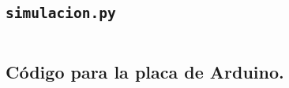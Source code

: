 











\subsection{ \texttt{simulacion.py}}\label{apendice:codigo:simulacion}

\inputminted{python}{apendices/codigo/densidad_celulas_13_sigma_definitivo}\label{apendice:codigo:script}



\subsection{Código para la placa de Arduino.}\label{apendice:codigo:arduino}

\inputminted{python}{apendices/codigo/tfm_definitivo.cpp}
